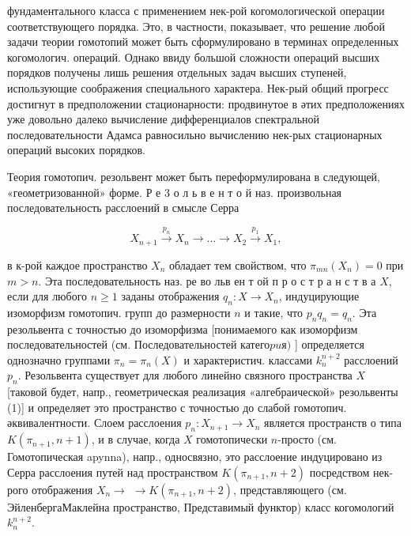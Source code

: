 \documentclass[10pt]{article}
\begin{document}
фундаментального класса с применением нек-рой когомологической операции соответствующего порядка. Это, в частности, показывает, что решение любой задачи теории гомотопий может быть сформулировано в терминах определенных когомологич. операций. Однако ввиду большой сложности операций высших порядков получены лишь решения отдельных задач высших ступеней, использующие соображения специального характера. Нек-рый общий прогресс достигнут в предположении стационарности: продвинутое в әтих предположениях уже довольно далеко вычисление дифференциалов спектральной последовательности Адамса равносильно вычислению нек-рых стационарных операций высоких порядков.



Теория гомотопич. резольвент может быть переформулирована в следующей, «геометризованной» форме. Р е 3 о л ь в е н т о й наз. произвольная последовательность расслоений в смысле Серра



\[

X_{n+1} \stackrel{p_{n}}{\longrightarrow} X_{n} \longrightarrow \ldots \longrightarrow X_{2} \stackrel{p_{1}}{\longrightarrow} X_{1},

\]



в к-рой каждое пространство $X_{n}$ обладает тем свойством, что $\pi_{m n}\left(X_{n}\right)=0$ при $m>n$. Эта последовательность наз. ре во льв ен т ой п р о с т р а н с т в а $X$, если для любого $n \geqslant 1$ заданы отображения $q_{n}: X \rightarrow X_{n}$, индуцирующие изоморфизм гомотопич. групп до размерности $n$ и такие, что $p_{n} q_{n}=q_{n}$. Эта резольвента с точностью до изоморфизма [понимаемого как изоморфизм последовательностей (см. Последовательностей катего$p u я)$ ] определяется однозначно группами $\pi_{n}=\pi_{n}(X)$ и характеристич. классами $k_{n}^{n+2}$ расслоений $p_{n}$. Резольвента существует для любого линейно связного пространства $X$ [таковой будет, напр., геометрическая реализация «алгебраической» резольвенты (1)] и определяет это пространство с точностью до слабой гомотопич. әквивалентности. Слоем расслоения $p_{n}: X_{n+1} \rightarrow X_{n}$ является пространств о типа $K\left(\pi_{n+1}, n+1\right)$, и в случае, когда $X$ гомотопически $n$-просто (см. Гомотопическая apynna), напр., односвязно, это расслоение индуцировано из Серра расслоения путей над пространством $K\left(\pi_{n+1}, n+2\right)$ посредством нек-рого отображения $X_{n} \rightarrow$ $\rightarrow K\left(\pi_{n+1}, n+2\right)$, представляющего (см. ЭйленбергаМаклейна пространство, Представимый функтор) класс когомологий $k_{n}^{n+2}$.
\end{document}

